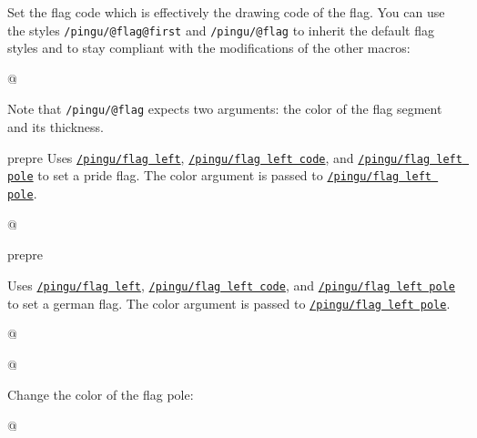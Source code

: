 \documentclass[parskip=half,english,numbers=noenddot,footnotes=nomultiple,oneside,fontsize=10pt,DIV=15,headinclude]{scrartcl}
\makeatletter
\def\pingu@listing@text{}
\def\lpingu#1{\begingroup\def\pingu@listing@text{#1}\lstinline[style=lstpingu,breakatwhitespace]'#1'\endgroup}
\def\@showcase@pre{pre}
\let\@showcase@cur\@showcase@pre
\def\@toggle@showcase{\ifx\@showcase@cur\@showcase@pre\global\let\@showcase@cur\@empty\else \global\let\@showcase@cur\@showcase@pre\fi}
\newcommand*\keyref[2][/pingu/]{\hyperref[pk:#1#2]{\lpingu{#1#2}}}
\makeatother
\begin{document}
{{{{
Set the flag code which is effectively the drawing code of the flag.
You can use the styles \lpingu{/pingu/@flag@first} and \lpingu{/pingu/@flag} to inherit the default flag styles and to stay compliant with the modifications of the other macros:
	\begin{tcblisting}{@}
\begin{tikzpicture}
	\pingu[flag left, flag left code={
	  \node[/pingu/@flag@first,
	  	/pingu/@flag={blue}{5mm}]
	  		(upper) at (0,0) {};
	  \node[below,/pingu/@flag={black}{4mm}]
	  	(lower) at (upper.south) {};
	}]
\end{tikzpicture}
\end{tcblisting}
Note that \lpingu{/pingu/@flag} expects two arguments: the color of the flag segment and its thickness.
\endsubkeyexplain

\@toggle@showcase %
	Uses \keyref{flag left}, \keyref{flag left code}, and \keyref{flag left pole} to set a pride flag. The color argument is passed to \keyref{flag left pole}.
\begin{tcblisting}{@}
\begin{tikzpicture}
	\pingu[pride flag left=green]
\end{tikzpicture}
\end{tcblisting}
\endshowkeyexplain
\@toggle@showcase %


	Uses \keyref{flag left}, \keyref{flag left code}, and \keyref{flag left pole} to set a german flag. The color argument is passed to \keyref{flag left pole}.
\begin{tcblisting}{@}
\begin{tikzpicture}
	\pingu[german flag left=green]
\end{tikzpicture}
\end{tcblisting}
\endshowkeyexplain


\begin{tcblisting}{@}
\begin{tikzpicture}
	\pingu[flag right=green]
\end{tikzpicture}
\end{tcblisting}
\endshowkeyexplain

Change the color of the flag pole:
	\begin{tcblisting}{@}
\begin{tikzpicture}
	\pingu[flag right, flag right pole=green]
\end{tikzpicture}
\end{tcblisting}
\endsubkeyexplain

}}}}
\end{document}
